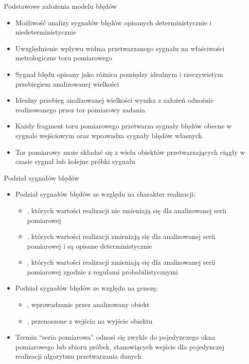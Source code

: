 \documentclass[12pt, polish, aspectratio = 169]{beamer}
\begin{document}
\begin{frame}{Podstawowe założenia modelu błędów}
\begin{itemize}
\item Możliwość analizy sygnałów błędów opisanych deterministycznie i niedeterministycznie
\item Uwzględnienie wpływu widma przetwarzanego sygnału na właściwości metrologiczne toru pomiarowego
\item Sygnał błędu opisany jako różnica pomiędzy idealnym i rzeczywistym przebiegiem analizowanej wielkości
\item Idealny przebieg analizowanej wielkości wynika z założeń odnośnie realizowanego przez tor pomiarowy zadania
\item Każdy fragment toru pomiarowego przetwarza sygnały błędów obecne w sygnale wejściowym oraz wprowadza sygnały błędów własnych
\item Tor pomiarowy może składać się z wielu obiektów przetwarzających ciągły w czasie sygnał lub kolejne próbki sygnału
\end{itemize}
\end{frame}

\begin{frame}{Podział sygnałów błędów}
\begin{itemize}
\item Podział sygnałów błędów ze względu na charakter realizacji:
	\begin{itemize}
	\item {}, których wartości realizacji nie zmieniają się dla analizowanej serii pomiarowej
	\item {}, których wartości realizacji zmieniają się dla analizowanej serii pomiarowej i są opisane deterministycznie
	\item {}, których wartości realizacji zmieniają się dla analizowanej serii pomiarowej zgodnie z regułami probabilistycznymi
	\end{itemize}
\item Podział sygnałów błędów ze względu na genezę:
	\begin{itemize}
	\item {}, wprowadzanie przez analizowany obiekt
	\item {}, przenoszone z wejścia na wyjście obiektu
	\end{itemize}
\item Termin \enquote{seria pomiarowa} odnosi się zwykle do pojedynczego okna pomiarowego lub zbioru próbek, stanowiących wejście dla pojedynczej realizacji algorytmu przetwarzania danych
\end{itemize}
\end{frame}
\end{document}

